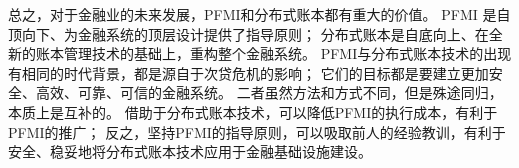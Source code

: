总之，对于金融业的未来发展，PFMI和分布式账本都有重大的价值。
PFMI 是自顶向下、为金融系统的顶层设计提供了指导原则；
分布式账本是自底向上、在全新的账本管理技术的基础上，重构整个金融系统。
PFMI与分布式账本技术的出现有相同的时代背景，都是源自于次贷危机的影响；
它们的目标都是要建立更加安全、高效、可靠、可信的金融系统。
二者虽然方法和方式不同，但是殊途同归，本质上是互补的。
借助于分布式账本技术，可以降低PFMI的执行成本，有利于PFMI的推广；
反之，坚持PFMI的指导原则，可以吸取前人的经验教训，有利于安全、稳妥地将分布式账本技术应用于金融基础设施建设。

